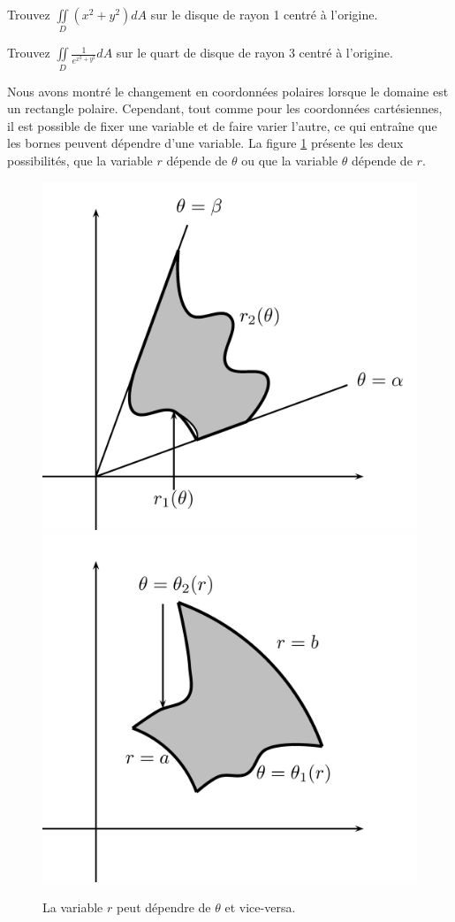 \documentclass[]{book}
\theoremstyle{definition}
\theoremstyle{definition}
\theoremstyle{definition}
\theoremstyle{remark}
\let\BeginKnitrBlock\begin \let\EndKnitrBlock\end
\begin{document}
\BeginKnitrBlock{example}
\protect\hypertarget{exm:unnamed-chunk-259}{}{\label{exm:unnamed-chunk-259}
}Trouvez \(\iint\limits_D (x^2+y^2)dA\) sur le disque de rayon 1 centré
à l'origine.
\EndKnitrBlock{example}
\vspace*{8cm}

\BeginKnitrBlock{example}
\protect\hypertarget{exm:unnamed-chunk-260}{}{\label{exm:unnamed-chunk-260}
}Trouvez \(\iint\limits_D \frac{1}{e^{x^2+y^2}}dA\) sur le quart de
disque de rayon 3 centré à l'origine.
\EndKnitrBlock{example}
\vspace*{8cm}

Nous avons montré le changement en coordonnées polaires lorsque le
domaine est un rectangle polaire. Cependant, tout comme pour les
coordonnées cartésiennes, il est possible de fixer une variable et de
faire varier l'autre, ce qui entraîne que les bornes peuvent dépendre
d'une variable. La figure \ref{fig:r-depend-theta} présente les deux
possibilités, que la variable \(r\) dépende de \(\theta\) ou que la
variable \(\theta\) dépende de \(r\).

\begin{figure}

{\centering \includegraphics[width=0.45\linewidth]{resources/images/latex/rdependtheta} \includegraphics[width=0.45\linewidth]{resources/images/latex/thetadependr} 

}

\caption{La variable $r$ peut dépendre de $\theta$ et vice-versa.}\label{fig:r-depend-theta}
\end{figure}
\end{document}
